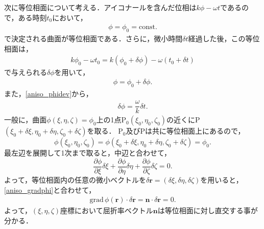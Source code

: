 次に等位相面について考える．アイコナールを含んだ位相は$k\phi-\omega{t}$であるので，ある時刻$t_0$において，
\begin{align}
  \phi = \phi_0 = \text{const}.
\end{align}
で決定される曲面が等位相面である．さらに，微小時間$\delta{t}$経過した後，この等位相面は，
\begin{align}
  k\phi_0-\omega{t_0}=k(\phi_0+\delta\phi)-\omega(t_0+\delta{t})\label{aniso_phidev}
\end{align}
で与えられる$\delta\phi$を用いて，
\begin{align}
  \phi=\phi_0+\delta\phi.
\end{align}
また，\eqref{aniso_phidev}から，
\begin{align}
  \delta\phi=\dfrac{\omega}{k}\delta{t}.
\end{align}
一般に，曲面$\phi(\xi,\eta,\zeta)=\phi_0$上の1点P$_0(\xi_0,\eta_0,\zeta_0)$の近くにP$(\xi_0+\delta\xi,\eta_0+\delta\eta,\zeta_0+\delta\zeta)$を取る．
P$_0$及びPは共に等位相面上にあるので，
\[\phi(\xi_0,\eta_0,\zeta_0)=\phi(\xi_0+\delta\xi,\eta_0+\delta\eta,\zeta_0+\delta\zeta)=\phi_0.\]
最左辺を展開して1次まで取ると，中辺と合わせて，
\[\dfrac{\partial\phi}{\partial\xi}\delta\xi+\dfrac{\partial\phi}{\partial\eta}\delta\eta+\dfrac{\partial\phi}{\partial\zeta}\delta\zeta=0.\]
よって，等位相面内の任意の微小ベクトルを$\delta{\boldsymbol{r}}=(\delta\xi,\delta\eta,\delta\zeta)$を用いると，\eqref{aniso_gradphi}と合わせて，
\begin{align}
  \text{grad}\,\phi(\boldsymbol{r})\cdot\delta\boldsymbol{r}=\boldsymbol{n}\cdot\delta\boldsymbol{r}=0.\label{aniso_ndr}
\end{align}
よって，$(\xi,\eta,\zeta)$座標において屈折率ベクトル$\boldsymbol{n}$は等位相面に対し直交する事が分かる．

%
%

